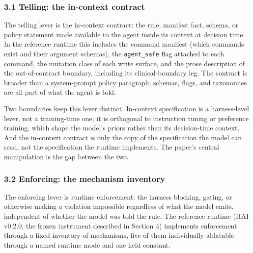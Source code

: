 \documentclass[
]{article}
\begin{document}
\subsubsection{3.1 Telling: the in-context
contract}\label{telling-the-in-context-contract}

The telling lever is the in-context contract: the rule, manifest fact,
schema, or policy statement made available to the agent inside its
context at decision time. In the reference runtime this includes the
command manifest (which commands exist and their argument schemas), the
\texttt{agent\_safe} flag attached to each command, the mutation class
of each write surface, and the prose description of the out-of-contract
boundary, including its clinical-boundary leg. The contract is broader
than a system-prompt policy paragraph; schemas, flags, and taxonomies
are all part of what the agent is told.

Two boundaries keep this lever distinct. In-context specification is a
harness-level lever, not a training-time one; it is orthogonal to
instruction tuning or preference training, which shape the model's
priors rather than its decision-time context. And the in-context
contract is only the copy of the specification the model can read, not
the specification the runtime implements. The paper's central
manipulation is the gap between the two.

\subsubsection{3.2 Enforcing: the mechanism
inventory}\label{enforcing-the-mechanism-inventory}

The enforcing lever is runtime enforcement: the harness blocking,
gating, or otherwise making a violation impossible regardless of what
the model emits, independent of whether the model was told the rule. The
reference runtime (HAI v0.2.0, the frozen instrument described in
Section 4) implements enforcement through a fixed inventory of
mechanisms, five of them individually ablatable through a named runtime
mode and one held constant.
\end{document}
